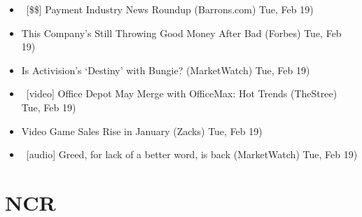 \documentclass[11pt,asymmetric]{article}
\begin{document}
\begin{itemize}
\item\ [\$\$] Payment Industry News Roundup (Barrons.com) Tue, Feb 19)
\item This Company's Still Throwing Good Money After Bad (Forbes) Tue, Feb 19)
\item Is Activision's `Destiny' with Bungie? (MarketWatch) Tue, Feb 19)
\item\ [video] Office Depot May Merge with OfficeMax: Hot Trends (TheStree) Tue, Feb 19)
\item Video Game Sales Rise in January (Zacks) Tue, Feb 19)
\item\ [audio] Greed, for lack of a better word, is back (MarketWatch) Tue, Feb 19)
\end{itemize}

\section*{NCR}
\end{document}
